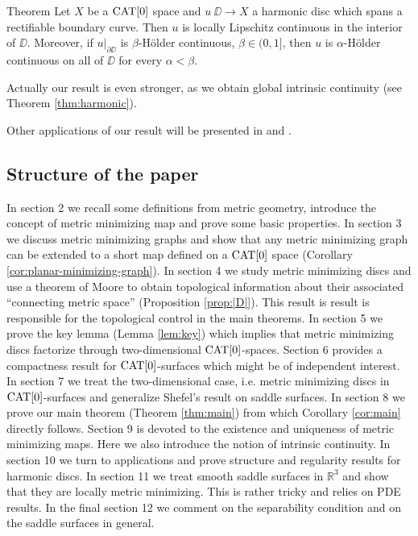 \documentclass[a4paper,10pt]{amsart}
\begin{document}
\begin{thm}{Theorem}\label{thm:Lipregularityintro}
Let $X$ be a $\mathop{\rm CAT}\nolimits[0]$ space 
and $u\:\DD\to X$ a harmonic disc which spans a rectifiable boundary curve. 
Then $u$ is locally Lipschitz continuous in the interior of $\DD$. 
Moreover, if $u|_{\partial\DD}$ is $\beta$-H\"older continuous, $\beta\in(0,1]$, then $u$ is $\alpha$-H\"older continuous on all of
$\DD$ for every $\alpha<\beta$.
\end{thm}

Actually our result is even stronger, as we obtain global intrinsic continuity (see Theorem \ref{thm:harmonic}). 

Other applications of our result will be presented in \cite{LSW} and \cite{St}. 

\subsection{Structure of the paper}
In section 2 we recall some definitions from metric geometry, introduce the concept of metric minimizing map and prove some
basic properties. In section 3 we discuss metric minimizing graphs and show that any metric minimizing graph can be extended to a short
map defined on a $\mathop{\rm CAT}\nolimits[0]$ space (Corollary \ref{cor:planar-minimizing-graph}). In section 4 we study metric minimizing discs and
use a theorem of Moore \cite{moore} to obtain topological information about  their 
associated "`connecting metric space"' (Proposition \ref{prop:|D|}). This result is result is responsible for 
the topological control in the main theorems. In section 5 we prove the key lemma (Lemma \ref{lem:key}) which implies that 
metric minimizing discs factorize through two-dimensional $\mathop{\rm CAT}\nolimits[0]$-spaces. Section 6 provides a compactness result for $\mathop{\rm CAT}\nolimits[0]$-surfaces
which might be of independent interest. In section 7 we treat the two-dimensional case, i.e. metric minimizing discs
in $\mathop{\rm CAT}\nolimits[0]$-surfaces and generalize Shefel's result on saddle surfaces. In section 8 we prove our main theorem (Theorem \ref{thm:main})
from which Corollary \ref{cor:main} directly follows. Section 9 is devoted to the existence and uniqueness of metric minimizing maps.
Here we also introduce the notion of intrinsic continuity. In section 10 we turn to applications and prove structure and regularity results
for harmonic discs. In section 11 we treat smooth saddle surfaces in $\mathbb{R}^3$ and show that they are locally metric minimizing.
This is rather tricky and relies on PDE results. In the final section 12 we comment on the separability condition and on the saddle 
surfaces in general.
\end{document}
